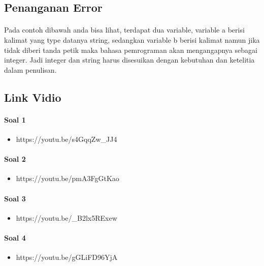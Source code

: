 \documentclass{article}
\begin{document}
    \subsection{Penanganan Error}
        \paragraph{}Pada contoh dibawah anda bisa lihat, terdapat dua variable, variable a berisi kalimat yang type datanya string, sedangkan variable b berisi kalimat namun jika tidak diberi tanda petik maka bahasa pemrograman akan mengangapnya sebagai integer. Jadi integer dan string harus disesuikan dengan kebutuhan dan ketelitia dalam penulisan.
            
    \subsection{Link Vidio}
        \paragraph{Soal 1}
            \begin{itemize}
                \item https://youtu.be/s4GqqZw\_JJ4
            \end{itemize}
            
        \paragraph{Soal 2}
            \begin{itemize}
                \item https://youtu.be/pmA3FgGtKao
            \end{itemize}
            
        \paragraph{Soal 3}
            \begin{itemize}
                \item https://youtu.be/\_B2lx5RExew
            \end{itemize}
        
        \paragraph{Soal 4}
            \begin{itemize}
                \item https://youtu.be/gGLiFD96YjA
            \end{itemize}
        
\end{document}
